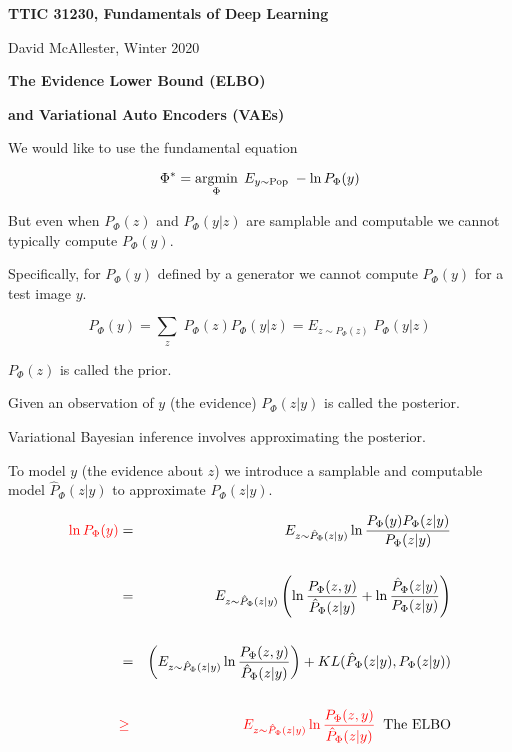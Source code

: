 





{\Huge

  \centerline{\bf TTIC 31230, Fundamentals of Deep Learning}
  \bigskip
  \centerline{David McAllester, Winter 2020}
  \vfill
  \vfil
  \centerline{\bf The Evidence Lower Bound (ELBO)}
  \vfill
  \centerline{\bf and Variational Auto Encoders (VAEs)}
  \vfill
  \vfill


We would like to use the fundamental equation

$$\Phi^* = \operatorname*{argmin}_\Phi\;E_{y \sim \mathrm{Pop}}\;- \ln P_\Phi(y)$$

\bigskip
\bigskip
But even when $P_\Phi(z)$ and $P_\Phi(y|z)$ are samplable and computable we cannot typically compute $P_\Phi(y)$.

\vfill
Specifically, for $P_\Phi(y)$ defined by a generator we cannot compute $P_\Phi(y)$ for a test image $y$.


{\color{red} $$P_\Phi(y) = \sum_z\;P_\Phi(z)P_\Phi(y|z) = E_{z \sim P_\Phi(z)}\;P_\Phi(y|z)$$}

\vfill
$P_\Phi(z)$ is called the prior.

\vfill
Given an observation of $y$ (the evidence) $P_\Phi(z|y)$ is called the posterior.

\vfill
Variational Bayesian inference involves approximating the posterior.


To model $y$ (the evidence about $z$) we introduce a samplable and computable model $\hat{P}_\Phi(z|y)$ to approximate $P_\Phi(z|y)$.

{\huge
\begin{eqnarray*}
 {\color{red} \ln P_\Phi(y)} & = & E_{z \sim \hat{P}_\Phi(z|y)} \ln \frac{P_\Phi(y)P_\Phi(z|y)}{P_\Phi(z|y)} \\
        \\
 & = & E_{z \sim \hat{P}_\Phi(z|y)} \left(\ln \frac{P_\Phi(z,y)}{\hat{P}_\Phi(z|y)} + \ln \frac{\hat{P}_\Phi(z|y)}{P_\Phi(z|y)}\right) \\
 \\
  & = & \left(E_{z \sim \hat{P}_\Phi(z|y)} \ln \frac{P_\Phi(z,y)}{\hat{P}_\Phi(z|y)}\right) + KL(\hat{P}_\Phi(z|y),P_\Phi(z|y)) \\
  \\
  & {\color{red} \geq} & {\color{red} E_{z \sim \hat{P}_\Phi(z|y)} \ln \frac{P_\Phi(z,y)}{\hat{P}_\Phi(z|y)}}\;\;\mbox{The ELBO}
\end{eqnarray*}
}


}
